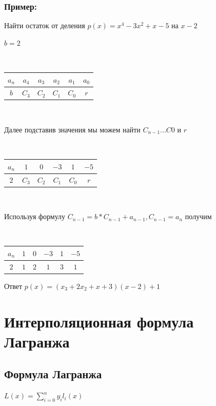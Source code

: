 \documentclass[12pt]{article}
\begin{document}
\subsubsection{Пример:}
Найти остаток от деления $p(x) = x^{4} - 3x^{2} + x -5$ на $x-2$\par
$b=2$\par
$ $\par
\begin{tabular}{ |c|c|c|c|c|c| }
    \hline
    $a_{n}$ & $a_{4}$ & $a_{3}$ & $a_{2}$ & $a_{1}$ & $a_{0}$ \\
    \hline
    \hline
    $b$     & $C_{3}$ & $C_{2}$ & $C_{1}$ & $C_{0}$ & $r$     \\
    \hline
\end{tabular}\par
$ $\par
Далее подставив значения мы можем найти $C_{n-1} ... C{0}$ и $r$\par
$ $\par
\begin{tabular}{ |c|c|c|c|c|c| }
    \hline
    $a_{n}$ & $1$     & $0$     & $-3$    & $1$     & $-5$ \\
    \hline
    \hline
    $2$     & $C_{3}$ & $C_{2}$ & $C_{1}$ & $C_{0}$ & $r$  \\
    \hline
\end{tabular}\par
$ $\par
Используя формулу $C_{n-1} = b*C_{n-1}+a_{n-1},C_{n-1}=a_{n}$ получим\par
$ $\par
\begin{tabular}{ |c|c|c|c|c|c| }
    \hline
    $a_{n}$ & $1$ & $0$ & $-3$ & $1$ & $-5$ \\
    \hline
    \hline
    $2$     & $1$ & $2$ & $1$  & $3$ & $1$  \\
    \hline
\end{tabular}\par
Ответ $p(x) =(x_{3} + 2x_{2} + x +3)(x-2) + 1$

\setcounter{section}{10}
\section{Интерполяционная формула Лагранжа}

\subsection{Формула Лагранжа}
$L(x) = \sum_{i=0}^n y_i l_i(x)$
\end{document}
